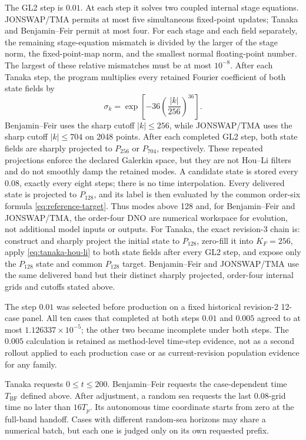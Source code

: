 \documentclass[10pt]{article}
\begin{document}
The GL2 step is $0.01$.  At each step it solves two coupled internal stage
equations.  JONSWAP/TMA permits at most five simultaneous fixed-point updates;
Tanaka and Benjamin--Feir permit at most four.  For each stage and each field
separately, the remaining stage-equation mismatch is divided by the
larger of the stage norm, the fixed-point-map norm, and the smallest normal
floating-point number.  The largest of these relative mismatches must be at
most $10^{-8}$.  After each Tanaka step, the program multiplies every retained
Fourier coefficient of both state fields by
\begin{equation}
  \sigma_k
  =\exp\!\left[-36\left(\frac{|k|}{256}\right)^{36}\right].
  \label{eq:tanaka-hou-li}
\end{equation}
Benjamin--Feir uses the sharp cutoff $|k|\leq256$, while JONSWAP/TMA uses the
sharp cutoff $|k|\leq704$ on 2048 points.  After each completed GL2 step,
both state fields are sharply projected to $P_{256}$ or $P_{704}$,
respectively.  These repeated projections enforce the declared Galerkin
space, but they are not Hou--Li filters and do not smoothly damp the retained
modes.  A candidate state is stored every $0.08$, exactly
every eight steps; there is no time interpolation.  Every delivered state is
projected to $P_{128}$, and its label is then evaluated by the common
order-six formula \eqref{eq:reference-target}.  Thus modes above 128 and, for
Benjamin--Feir and JONSWAP/TMA, the order-four DNO are numerical workspace for
evolution, not additional model inputs or outputs.
For Tanaka, the exact revision-3 chain is: construct and sharply project the
initial state to \(P_{128}\), zero-fill it into \(K_F=256\), apply
\eqref{eq:tanaka-hou-li} to both state fields after every GL2 step, and expose
only the \(P_{128}\) state and common \(P_{128}\) target.  Benjamin--Feir and
JONSWAP/TMA use the same delivered band but their distinct sharply projected,
order-four internal grids and cutoffs stated above.

The step \(0.01\) was selected before production on a fixed historical
revision-2 12-case panel.
All ten cases that completed at both steps \(0.01\) and \(0.005\) agreed to
at most \(1.126337\times10^{-5}\); the other two became incomplete under
both steps.  The \(0.005\) calculation is retained as method-level time-step
evidence, not as a second rollout applied to each production case or as
current-revision population evidence for any family.

Tanaka requests $0\leq t\leq200$.  Benjamin--Feir requests the
case-dependent time $T_{\mathrm{BF}}$ defined above.  After adjustment, a
random sea requests the last $0.08$-grid time no later than $16T_p$.  Its
autonomous time coordinate starts from zero at the full-band handoff.  Cases with
different random-sea horizons may share a numerical batch, but each one is
judged only on its own requested prefix.
\end{document}
